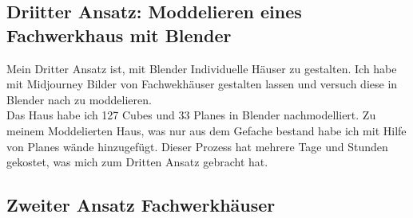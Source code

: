 {\subsection{Driitter Ansatz: Moddelieren eines Fachwerkhaus mit Blender}
Mein Dritter Ansatz ist, mit Blender Individuelle Häuser zu gestalten. Ich habe mit Midjourney Bilder von Fachwekhäuser gestalten lassen und versuch diese in Blender nach zu moddelieren.
\\
Das Haus habe ich 127 Cubes und 33 Planes in Blender nachmodelliert. Zu meinem Moddelierten Haus, was nur aus dem Gefache bestand habe ich mit Hilfe von Planes wände hinzugefügt.
Dieser Prozess hat mehrere Tage und Stunden gekostet, was mich zum Dritten Ansatz gebracht hat.

\subsection{Zweiter Ansatz Fachwerkhäuser}%

}
